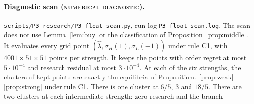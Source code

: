 \documentclass[12pt]{article}
\theoremstyle{definition}
\theoremstyle{remark}
\newcommand{\lh}{\hat\lambda}
\newcommand{\st}[1]{\textsc{#1}}
\begin{document}
\paragraph{Diagnostic scan (\st{numerical diagnostic}).} \texttt{scripts/P3\_research/P3\_float\_scan.py}, run log
\texttt{P3\_float\_scan.log}. The scan does not use Lemma~\ref{lem:buy} or the classification of Proposition~\ref{prop:middle}. It evaluates every
grid point $(\lh,\sigma_H(1),\sigma_L(-1))$ under rule C1, with $4001\times51\times51$ points per strength. It keeps
the points with order regret at most $5\cdot10^{-4}$ and research residual at most $3\cdot10^{-4}$. At each of the six
strengths, the clusters of kept points are exactly the equilibria of
Propositions~\ref{prop:weak}--\ref{prop:strong} under rule C1. There is one cluster at $6/5$, $3$ and $18/5$. There are
two clusters at each intermediate strength: zero research and the branch.
\end{document}
